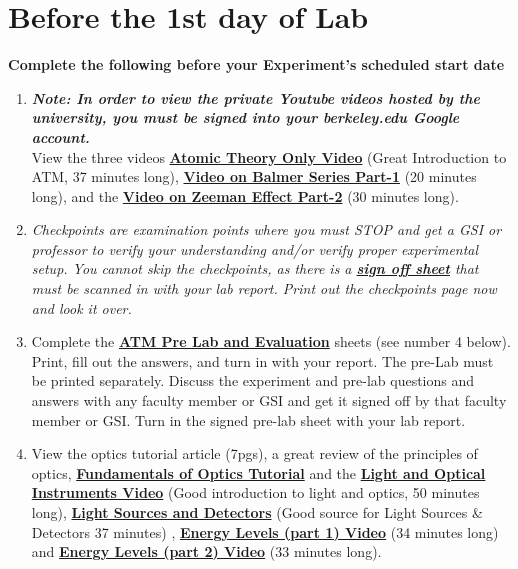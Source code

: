 \documentclass{../lab}
\begin{document}
\section{Before the 1st day of Lab}

\textbf{Complete the following before your Experiment's scheduled start date}

\begin{enumerate}
    \item \emph{\textbf{Note: In order to view the private Youtube videos hosted by the university, you must be signed into your berkeley.edu Google account.}} \\
    View the three videos \href{http://youtu.be/iJ\_4ygOaE7A}{\textbf{Atomic Theory Only Video}} (Great Introduction to ATM, 37 minutes long), \href{http://youtu.be/M41IKkUAG-A}{\textbf{Video on Balmer Series Part-1}} (20 minutes long), and the \href{http://youtu.be/-l2chO5SLew}{\textbf{Video on Zeeman Effect Part-2}} (30 minutes long).

    \item \emph{Checkpoints are examination points where you must STOP and get a GSI or professor to verify your understanding and/or verify proper experimental setup. You cannot skip the checkpoints, as there is a \href{http://experimentationlab.berkeley.edu/node/128}{\textbf{sign off sheet}} that must be scanned in with your lab report. Print out the checkpoints page now and look it over.}

    \item Complete the \href{http://experimentationlab.berkeley.edu/ATMPreLab}{\textbf{ATM Pre Lab and Evaluation}} sheets (see number 4 below). Print, fill out the answers, and turn in with your report. The pre-Lab must be printed separately. Discuss the experiment and pre-lab questions and answers with any faculty member or GSI and get it signed off by that faculty member or GSI. Turn in the signed pre-lab sheet with your lab report.

    \item View the optics tutorial article (7pgs), a great review of the principles of optics, \href{http://experimentationlab.berkeley.edu/sites/default/files/QIE/fundamental-Optics.pdf}{\textbf{Fundamentals of Optics Tutorial}}\textbf{ }and the \href{http://youtu.be/zUGBt5vc5FA}{\textbf{Light and Optical Instruments Video}}\textbf{ }(Good introduction to light and optics, 50 minutes long), \href{http://youtu.be/lQKLakISoBA}{\textbf{Light Sources and Detectors}} (Good source for Light Sources \& Detectors 37 minutes) , \href{http://youtu.be/wyBOVjU5bBQ}{\textbf{Energy Levels (part 1) Video}} (34 minutes long) and \href{http://youtu.be/Eypw0DmVBxk}{\textbf{Energy Levels (part 2) Video}} (33 minutes long).


\end{enumerate}
\end{document}
